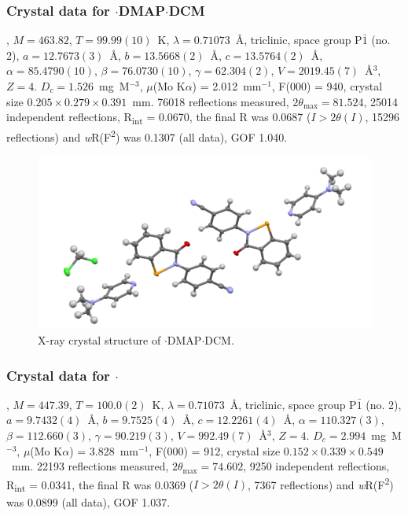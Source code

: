 \begin{refsection}
\subsubsection{Crystal data for \texorpdfstring{$ \cdot $DMAP$ \cdot $DCM}{C21.50 H19 Cl N4 O Se}}
, $M=463.82$, $T=99.99(10)$~K, $ \lambda=0.71073 $~\AA, triclinic, space group P$\bar{1}$ (no. 2), $a = 12.7673(3)$~\AA, $b = 13.5668(2)$~\AA, $c = 13.5764(2)$~\AA, $\alpha = 85.4790(10)$\degree, $\beta = 76.0730(10)$\degree, $\gamma = 62.304(2)$\degree, $V = 2019.45(7)$~\AA$^{3}$, $Z = 4$. $D_{c}= 1.526$~mg~M$^{-3}$, $\mu$(Mo K$\alpha$) = 2.012~mm$^{-1}$, F(000) = 940, crystal size $0.205 \times 0.279 \times 0.391$~mm. 76018 reflections measured, $2\theta_{\max}=81.524$\degree, 25014 independent reflections, R\textsubscript{int} = 0.0670, the final R was 0.0687 ($I > 2\theta(I)$, 15296 reflections) and \textit{w}R(F\textsuperscript{2}) was 0.1307 (all data), GOF 1.040.

\begin{figure}
  \includegraphics[width=0.6\linewidth]{Figures/ebs-4cn-dmap-dcm-xtal.pdf}
  \caption{X-ray crystal structure of \texorpdfstring{$ \cdot $DMAP$ \cdot $DCM}{C21.50 H19 Cl N4 O Se}.}
\end{figure}

\subsubsection{Crystal data for \texorpdfstring{$ \cdot $}{C23 H20 N4 O Se}}
, $M=447.39$, $T=100.0(2)$~K, $ \lambda=0.71073 $~\AA, triclinic, space group P$\bar{1}$ (no. 2), $a = 9.7432(4)$~\AA, $b = 9.7525(4)$~\AA, $c = 12.2261(4)$~\AA, $\alpha = 110.327(3)$\degree, $\beta = 112.660(3)$\degree, $\gamma = 90.219(3)$\degree, $V = 992.49(7)$~\AA$^{3}$, $Z = 4$. $D_{c}= 2.994$~mg~M$^{-3}$, $\mu$(Mo K$\alpha$) = 3.828~mm$^{-1}$, F(000) = 912, crystal size $0.152 \times 0.339 \times 0.549$~mm. 22193 reflections measured, $2\theta_{\max}=74.602$\degree, 9250 independent reflections, R\textsubscript{int} = 0.0341, the final R was 0.0369 ($I > 2\theta(I)$, 7367 reflections) and \textit{w}R(F\textsuperscript{2}) was 0.0899 (all data), GOF 1.037.


\end{refsection}
